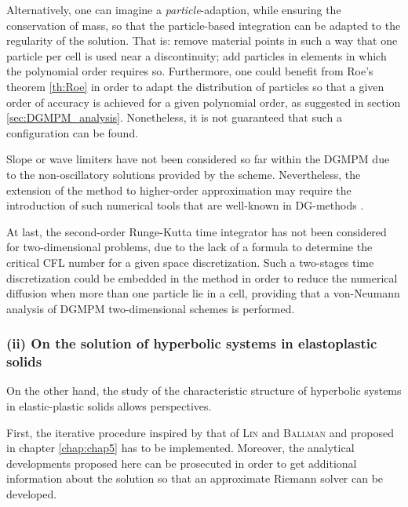 Alternatively, one can imagine a \textit{particle}-adaption, while ensuring the conservation of mass, so that the particle-based integration can be adapted to the regularity of the solution. 
That is: remove material points in such a way that one particle per cell is used near a discontinuity; add particles in elements in which the polynomial order requires so. 
Furthermore, one could benefit from Roe's theorem \ref{th:Roe} in order to adapt the distribution of particles so that a given order of accuracy is achieved for a given polynomial order, as suggested in section \ref{sec:DGMPM_analysis}.
Nonetheless, it is not guaranteed that such a configuration can be found.

Slope or wave limiters have not been considered so far within the DGMPM due to the non-oscillatory solutions provided by the scheme.
Nevertheless, the extension of the method to higher-order approximation may require the introduction of such numerical tools that are well-known in DG-methods \cite{Cockburn}.

At last, the second-order Runge-Kutta time integrator has not been considered for two-dimensional problems, due to the lack of a formula to determine the critical CFL number for a given space discretization.
Such a two-stages time discretization could be embedded in the method in order to reduce the numerical diffusion when more than one particle lie in a cell, providing that a von-Neumann analysis of DGMPM two-dimensional schemes is performed.


\subsubsection*{(ii) On the solution of hyperbolic systems in elastoplastic solids}
On the other hand, the study of the characteristic structure of hyperbolic systems in elastic-plastic solids allows perspectives.

First, the iterative procedure inspired by that of \textsc{Lin} and \textsc{Ballman} \cite{Lin_et_Ballman} and proposed in chapter \ref{chap:chap5} has to be implemented.
Moreover, the analytical developments proposed here can be prosecuted in order to get additional information about the solution so that an approximate Riemann solver can be developed.

